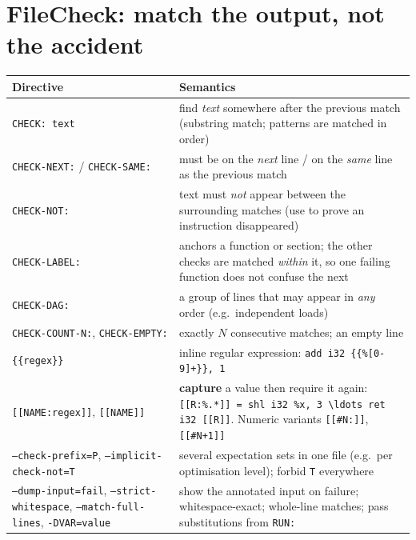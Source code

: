 \documentclass[10pt,a4paper,openany,oneside]{report}
\newcommand{\prio}[1]{\texorpdfstring{\ifcase#1\or{\color{gold}\ding{72}}\or{\color{gold}\ding{72}\ding{72}}\or{\color{gold}\ding{72}\ding{72}\ding{72}}\fi}{}}
\begin{document}
\section{FileCheck: match the output, not the accident \prio{2}}
\begin{center}\small
\begin{xltabular}{\textwidth}{@{}L{4.3cm}Y@{}}
\toprule
\textbf{Directive} & \textbf{Semantics}\\
\midrule\endhead
\texttt{CHECK: text} & find \emph{text} somewhere after the previous match (substring match; patterns are matched in order)\\
\texttt{CHECK-NEXT:} / \texttt{CHECK-SAME:} & must be on the \emph{next} line / on the \emph{same} line as the previous match\\
\texttt{CHECK-NOT:} & text must \emph{not} appear between the surrounding matches (use to prove an instruction disappeared)\\
\texttt{CHECK-LABEL:} & anchors a function or section; the other checks are matched \emph{within} it, so one failing function does not confuse the next\\
\texttt{CHECK-DAG:} & a group of lines that may appear in \emph{any} order (e.g.\ independent loads)\\
\texttt{CHECK-COUNT-N:}, \texttt{CHECK-EMPTY:} & exactly $N$ consecutive matches; an empty line\\
\texttt{\{\{regex\}\}} & inline regular expression: \texttt{add i32 \{\{\%[0-9]+\}\}, 1}\\
\texttt{[[NAME:regex]]}, \texttt{[[NAME]]} & \textbf{capture} a value then require it again: \texttt{[[R:\%.*]] = shl i32 \%x, 3 \textbackslash{}ldots ret i32 [[R]]}. Numeric variants \texttt{[[\#N:]]}, \texttt{[[\#N+1]]}\\
\texttt{--check-prefix=P}, \texttt{--implicit-check-not=T} & several expectation sets in one file (e.g.\ per optimisation level); forbid \texttt{T} everywhere\\
\texttt{--dump-input=fail}, \texttt{--strict-whitespace}, \texttt{--match-full-lines}, \texttt{-DVAR=value} & show the annotated input on failure; whitespace-exact; whole-line matches; pass substitutions from \texttt{RUN:}\\
\bottomrule
\end{xltabular}
\end{center}
\end{document}
